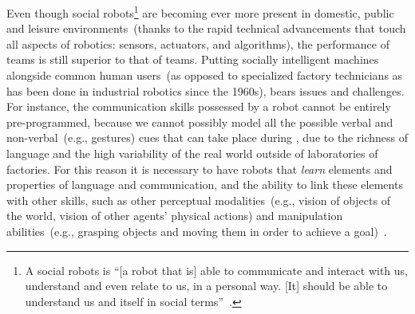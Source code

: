 
Even though social robots\footnote{A social robots is ``[a robot that is] able to communicate and interact with us, understand and even relate to us, in a personal way. [It] should be able to understand us and itself in social terms''~\cite{breazeal:2002:dsr}.} are becoming ever more present in domestic, public and leisure environments~(thanks to the rapid technical advancements that touch all aspects of robotics: sensors, actuators, and algorithms), the performance of \hh{} teams is still superior to that of \hr{} teams.
Putting socially intelligent machines alongside common human users~(as opposed to specialized factory technicians as has been done in industrial robotics since the 1960s), bears issues and challenges.
For instance, the communication skills possessed by a robot cannot be entirely pre-programmed, because we cannot possibly model all the possible verbal and non-verbal~(e.g., gestures) cues that can take place during \hri, due to the richness of language and the high variability of the real world outside of laboratories of factories.
For this reason it is necessary to have robots that \emph{learn} elements and properties of language and communication, and the ability to link these elements with other skills, such as other perceptual modalities~(e.g., vision of objects of the world, vision of other agents' physical actions) and manipulation abilities~(e.g., grasping objects and moving them in order to achieve a goal)~\cite{steels:2003:trendscogsci}.

